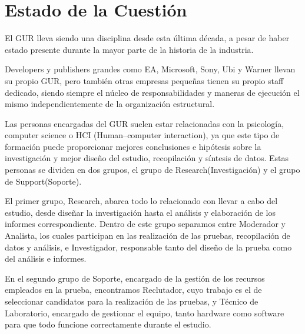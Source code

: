 \chapter{Estado de la Cuestión}
\label{cap:estadoDeLaCuestion}



El GUR lleva siendo una disciplina desde esta última década, a pesar de haber estado presente durante la mayor parte de la historia de la industria. 

Developers y publishers grandes como EA, Microsoft, Sony, Ubi y Warner llevan su propio GUR, pero también otras empresas pequeñas tienen su propio staff dedicado, siendo siempre el núcleo de responsabilidades y maneras de ejecución el mismo independientemente de la organización estructural.

Las personas encargadas del GUR suelen estar relacionadas con la psicología, computer science o HCI (Human–computer interaction), ya que este tipo de formación puede proporcionar mejores conclusiones e hipótesis sobre la investigación y mejor diseño del estudio, recopilación y síntesis de datos. Estas personas se dividen en dos grupos, el grupo de Research(Investigación) y el grupo de Support(Soporte).

El primer grupo, Research, abarca todo lo relacionado con llevar a cabo del estudio, desde diseñar la investigación hasta el análisis y elaboración de los informes correspondiente. Dentro de este grupo separamos entre Moderador y Analista, los cuales participan en las realización de las pruebas, recopilación de datos y análisis, e Investigador, responsable tanto del diseño de la prueba como del análisis e informes.

En el segundo grupo de Soporte, encargado de la gestión de los recursos empleados en la prueba, encontramos Reclutador, cuyo trabajo es el de seleccionar candidatos para la realización de las pruebas, y Técnico de Laboratorio, encargado de gestionar el equipo, tanto hardware como software para que todo funcione correctamente durante el estudio.

